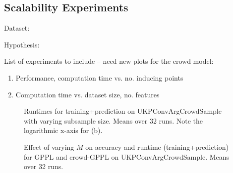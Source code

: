\subsection{Scalability Experiments}\label{sec:exp_scale}

Dataset:

Hypothesis: 

List of experiments to include -- need new plots for the crowd model:
\begin{enumerate}
\item Performance, computation time vs. no. inducing points
\item Computation time vs. dataset size, no. features
\end{enumerate}

\begin{figure}
\caption{
    Runtimes for training+prediction on UKPConvArgCrowdSample with varying subsample size. Means over 32 runs. 
    Note the logarithmic x-axis for (b).
}
\end{figure}
\begin{figure}
\caption{
Effect of varying $M$ on accuracy and runtime (training+prediction) for GPPL and crowd-GPPL on UKPConvArgCrowdSample. Means over 32 runs.
}
\end{figure}